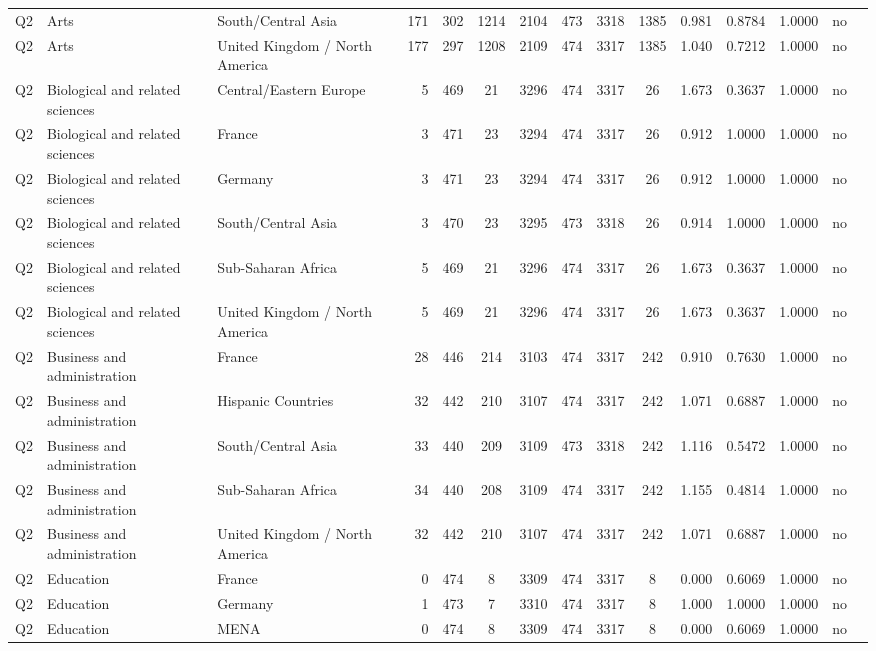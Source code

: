 \begin{longtable}{lllrcccccccccll}
Q2 & Arts & South/Central Asia & 171 & 302 & 1214 & 2104 & 473 & 3318 & 1385 & 0.981 & 0.8784 & 1.0000 & no \\
Q2 & Arts & United Kingdom / North America & 177 & 297 & 1208 & 2109 & 474 & 3317 & 1385 & 1.040 & 0.7212 & 1.0000 & no \\
Q2 & Biological and related sciences & Central/Eastern Europe & 5 & 469 & 21 & 3296 & 474 & 3317 & 26 & 1.673 & 0.3637 & 1.0000 & no \\
Q2 & Biological and related sciences & France & 3 & 471 & 23 & 3294 & 474 & 3317 & 26 & 0.912 & 1.0000 & 1.0000 & no \\
Q2 & Biological and related sciences & Germany & 3 & 471 & 23 & 3294 & 474 & 3317 & 26 & 0.912 & 1.0000 & 1.0000 & no \\
Q2 & Biological and related sciences & South/Central Asia & 3 & 470 & 23 & 3295 & 473 & 3318 & 26 & 0.914 & 1.0000 & 1.0000 & no \\
Q2 & Biological and related sciences & Sub-Saharan Africa & 5 & 469 & 21 & 3296 & 474 & 3317 & 26 & 1.673 & 0.3637 & 1.0000 & no \\
Q2 & Biological and related sciences & United Kingdom / North America & 5 & 469 & 21 & 3296 & 474 & 3317 & 26 & 1.673 & 0.3637 & 1.0000 & no \\
Q2 & Business and administration & France & 28 & 446 & 214 & 3103 & 474 & 3317 & 242 & 0.910 & 0.7630 & 1.0000 & no \\
Q2 & Business and administration & Hispanic Countries & 32 & 442 & 210 & 3107 & 474 & 3317 & 242 & 1.071 & 0.6887 & 1.0000 & no \\
Q2 & Business and administration & South/Central Asia & 33 & 440 & 209 & 3109 & 473 & 3318 & 242 & 1.116 & 0.5472 & 1.0000 & no \\
Q2 & Business and administration & Sub-Saharan Africa & 34 & 440 & 208 & 3109 & 474 & 3317 & 242 & 1.155 & 0.4814 & 1.0000 & no \\
Q2 & Business and administration & United Kingdom / North America & 32 & 442 & 210 & 3107 & 474 & 3317 & 242 & 1.071 & 0.6887 & 1.0000 & no \\
Q2 & Education & France & 0 & 474 & 8 & 3309 & 474 & 3317 & 8 & 0.000 & 0.6069 & 1.0000 & no \\
Q2 & Education & Germany & 1 & 473 & 7 & 3310 & 474 & 3317 & 8 & 1.000 & 1.0000 & 1.0000 & no \\
Q2 & Education & MENA & 0 & 474 & 8 & 3309 & 474 & 3317 & 8 & 0.000 & 0.6069 & 1.0000 & no \\

\end{longtable}
